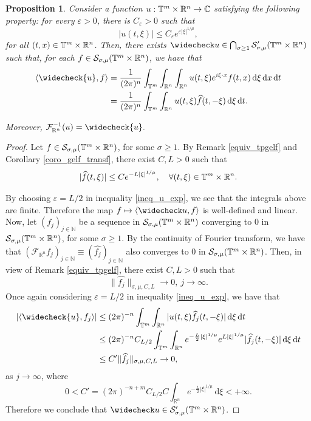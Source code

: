 \documentclass[11pt,reqno]{amsart}
\numberwithin{equation}{section}
\newtheorem{prop}[theorem]{Proposition}
\theoremstyle{definition}
\theoremstyle{definition}
\newcommand{\T}{\mathbb{T}}
\newcommand{\G}{\mathnormal{\mathbb{T}^{m}\times\mathbb{R}^n}}
\newcommand{\R}{\mathbb{R}}
\newcommand{\N}{\mathbb{N}}
\renewcommand{\S}{\mathcal{S}_{\sigma,\mu}(\G)}
\renewcommand{\SS}{\mathcal{S}'_{\sigma,\mu}(\G)}
\begin{document}
    \begin{prop}\label{proppartialdecayrndistribinv}
        Consider a function $u:\G\to\mathbb{C}$ satisfying the following property: for every $\varepsilon>0$, there is $C_\varepsilon>0$ such that
        \begin{equation}\label{ineq_u_exp}
            |u(t,\xi)|\leq C_\varepsilon e^{\varepsilon|\xi|^{1/\mu}},
        \end{equation}
        for all $(t,x)\in\G$. Then, there exists $\widecheck u\in\bigcap_{\sigma\geq 1} \SS$ such that, for each $f\in\S$, we have that
        \begin{align*}
         \langle \widecheck{u},f\rangle &=\frac{1}{(2\pi)^n}\int_{\T^m} \int_{\R^n}\int_{\R^n}u(t,\xi)e^{i\xi\cdot x }f(t,x)\,\mathrm{d}\xi \,\mathrm{d}x\,\mathrm{d}t\\
         &=\frac{1}{(2\pi)^n}\int_{\T^m} \int_{\R^n} u(t,\xi)\widehat{f}(t,-\xi)\,\mathrm{d}\xi \,\mathrm{d}t.
      \end{align*}
      
      Moreover, $\mathcal{F}^{-1}_{\R^n}({u}) = \widecheck{u}.$
    \end{prop}
    \begin{proof}
        Let $f\in\S$, for some $\sigma\geq 1$. By Remark \ref{equiv_tpgelf} and Corollary \ref{coro_gelf_transf}, there exist $C,L>0$ such that
        \[|\widehat f(t,\xi)|\leq Ce^{-L|\xi|^{1/\mu}},\quad\forall (t,\xi)\in\G.\]

       	By choosing $\varepsilon=L/2$ in inequality \eqref{ineq_u_exp}, we see that the integrals above are finite. Therefore the map $f\mapsto\langle\widecheck u,f\rangle$ is well-defined and linear. Now, let $(f_j)_{j\in\N}$ be a sequence in $\S$ converging to $0$ in $\S$, for some $\sigma\geq 1$. By the continuity of Fourier transform, we have that $(\mathcal{F}_{\R^n}{f_j})_{j\in\N}\equiv (\widehat{f_j})_{j\in\N}$ also converges to $0$ in $\S$. Then, in view of Remark \ref{equiv_tpgelf}, there exist $C,L>0$ such that
        \[\|\widehat{f_j}\|_{\sigma,\mu,C,L}\to 0,\ j\to\infty.\]
        Once again considering $\varepsilon=L/2$ in inequality \eqref{ineq_u_exp}, we have that
        \begin{align*}
            |\langle \widecheck{u},f_j\rangle | & \leq (2\pi)^{-n}\int_{\T^m}\int_{\R^n}|u(t,\xi)\widehat{f_j}(t,-\xi)|\,\mathrm{d}\xi\,\mathrm{d}t\\
            & \leq {(2\pi)^{-n} C_{L/2}}\int_{\T^m}\int_{\R^n} e^{-\frac{L}{2}|\xi|^{1/\mu}}e^{L|\xi|^{1/\mu}}|\widehat{f_j}(t,-\xi)|\,\mathrm{d}\xi\,\mathrm{d}t\\
            & \leq C'\|\widehat{f_j}\|_{\sigma,\mu,C,L}\to 0,
        \end{align*}
        as $j\to\infty$, where
        \[0<C'={(2\pi)^{-n+m}C_{L/2}C}\int_{\R^n}e^{-\frac{L}{2}|\xi|^{1/\mu}}\,\mathrm{d}\xi <+\infty.\]
        Therefore we conclude that $\widecheck u\in\SS$.
    \end{proof}
\end{document}
